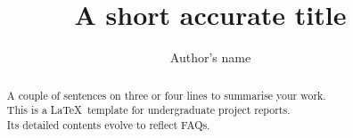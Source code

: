 \documentclass[a4paper,11pt]{report}
\begin{document}
\title{A short accurate title}
\author{Author's name}
\maketitle
\begin{abstract}\centering
A couple of sentences on three or four lines to summarise your work.\\ 
This is a \LaTeX\ template for undergraduate project reports.\\
Its detailed contents evolve to reflect FAQs.
\end{abstract}
\tableofcontents





\appendix





\end{document}

